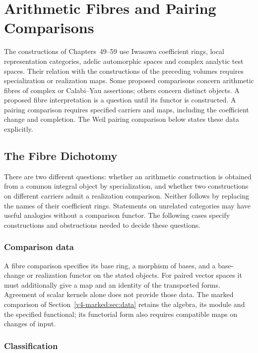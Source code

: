 \chapter{Arithmetic Fibres and Pairing Comparisons}
\label{v4-arith:w6-i:chapter}

The constructions of Chapters~49--59 use Iwasawa coefficient rings,
local representation categories, adelic automorphic spaces and
complex analytic test spaces. Their relation with the constructions
of the preceding volumes requires specialization or realization maps.  Some proposed comparisons concern arithmetic fibres of
complex or Calabi--Yau assertions; others concern distinct objects.
A proposed fibre interpretation is a question until its functor is constructed.  A pairing comparison requires specified carriers and maps,
including the coefficient change and completion. The Weil pairing
comparison below states these data explicitly.

\section{The Fibre Dichotomy}
\label{v4-arith:w6-i:purpose}

There are two different questions: whether an arithmetic construction
is obtained from a common integral object by specialization, and whether
two constructions on different carriers admit a realization comparison.
Neither follows by replacing the names of their coefficient rings.
Statements on unrelated categories may have useful analogies without
a comparison functor. The following cases specify constructions and
obstructions needed to decide these questions.

\subsection{Comparison data}
\label{v4-arith:w6-i:comparison-criterion}
A fibre comparison specifies its base ring, a morphism of bases,
and a base-change or realization functor on the stated objects.
For paired vector spaces it must additionally give a map and an
identity of the transported forms. Agreement of scalar kernels
alone does not provide those data. The marked comparison of
Section~\ref{v4-marked:sec:data} retains the algebra, its module and the
specified functional; its functorial form also requires compatible
maps on changes of input.

\subsection{Classification}
\label{v4-arith:w6-i:alignment-table}


